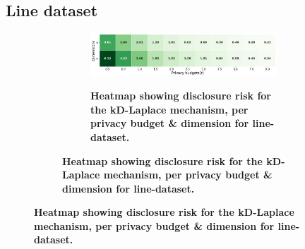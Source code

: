 \subsection{Line dataset} \label{appendix:results-privacy-line-dataset}
\begin{figure}
    \centering
    \begin{subfigure}[b]{0.85\textwidth}
        \begin{subfigure}[c]{1\textwidth}
            \caption{\textbf{Heatmap showing disclosure risk for the kD-Laplace mechanism, per privacy budget \& dimension for line-dataset.}}
            \includegraphics[width=1\textwidth]{Results/kd-laplace/kd-Laplace/line-dataset/distance.png}
            \label{fig:privacy-risk_line-dataset_adversial_advantage_kd-laplace}
        \end{subfigure}
        \vfill %


\end{subfigure}
\end{figure}
